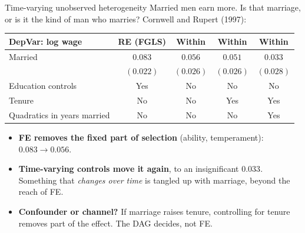 \documentclass[
  11pt,
  ignorenonframetext,
  aspectratio=169,
]{beamer}
\providecommand{\tightlist}{%
  \setlength{\itemsep}{0pt}\setlength{\parskip}{0pt}}
\begin{document}
\begin{frame}{Time-varying unobserved heterogeneity}
\protect{}\label{time-varying-unobserved-heterogeneity}
Married men earn more. Is that marriage, or is it the kind of man who
marries? Cornwell and Rupert (1997):

\begin{center}\small
\begin{tabular}{lcccc}
\toprule
DepVar: log wage & RE (FGLS) & Within & Within & Within \\
\midrule
Married & $0.083$ & $0.056$ & $0.051$ & $0.033$ \\
        & $(0.022)$ & $(0.026)$ & $(0.026)$ & $(0.028)$ \\
\midrule
Education controls & Yes & No & No & No \\
Tenure             & No  & No & Yes & Yes \\
Quadratics in years married & No & No & No & Yes \\
\bottomrule
\end{tabular}
\end{center}

\vspace{-0.2em}

\begin{itemize}
\tightlist
\item
  \textbf{FE removes the fixed part of selection} (ability,
  temperament): \(0.083 \to 0.056\).
\item
  \textbf{Time-varying controls move it again}, to an insignificant
  \(0.033\). Something that \emph{changes over time} is tangled up with
  marriage, beyond the reach of FE.
\item
  \textbf{Confounder or channel?} If marriage raises tenure, controlling
  for tenure removes part of the effect. The DAG decides, not FE.
\end{itemize}
\end{frame}
\end{document}
